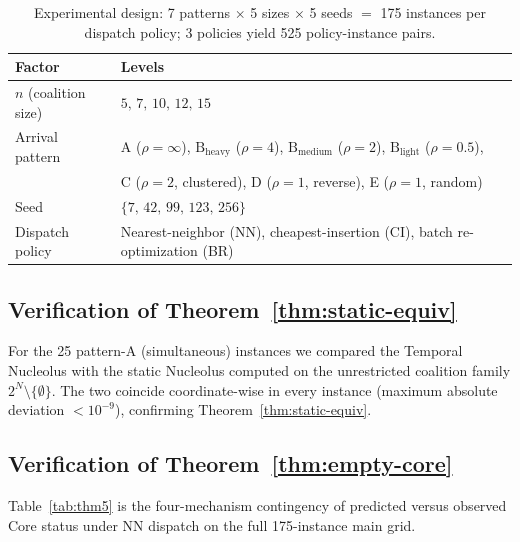 \documentclass[11pt]{article}
\theoremstyle{plain}
\theoremstyle{definition}
\theoremstyle{remark}
\begin{document}
\begin{table}[t]
\centering
\caption{Experimental design: 7 patterns $\times$ 5 sizes $\times$ 5 seeds $=$ 175 instances per dispatch policy; 3 policies yield 525 policy-instance pairs.}
\label{tab:design}
\small
\begin{tabular}{@{}ll@{}}
\toprule
Factor & Levels \\
\midrule
$n$ (coalition size) & $5,\,7,\,10,\,12,\,15$ \\
Arrival pattern & A ($\rho=\infty$), $\text{B}_{\text{heavy}}$ ($\rho=4$), $\text{B}_{\text{medium}}$ ($\rho=2$), $\text{B}_{\text{light}}$ ($\rho=0.5$), \\
                & C ($\rho=2$, clustered), D ($\rho=1$, reverse), E ($\rho=1$, random) \\
Seed & $\{7,\,42,\,99,\,123,\,256\}$ \\
Dispatch policy & Nearest-neighbor (NN), cheapest-insertion (CI), batch re-optimization (BR) \\
\bottomrule
\end{tabular}
\end{table}

\subsection{Verification of Theorem~\ref{thm:static-equiv}}

For the 25 pattern-A (simultaneous) instances we compared the Temporal Nucleolus with the static Nucleolus computed on the unrestricted coalition family $2^N\setminus\{\emptyset\}$. The two coincide coordinate-wise in every instance (maximum absolute deviation $<10^{-9}$), confirming Theorem~\ref{thm:static-equiv}.

\subsection{Verification of Theorem~\ref{thm:empty-core}}

Table~\ref{tab:thm5} is the four-mechanism contingency of predicted versus observed Core status under NN dispatch on the full 175-instance main grid.
\end{document}
